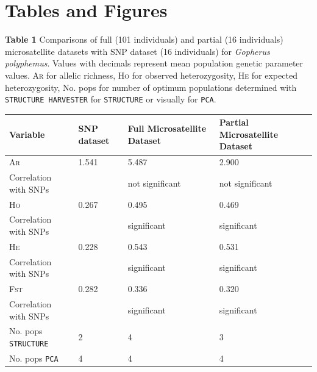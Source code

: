 \documentclass[english]{article}\usepackage[]{graphicx}\usepackage[]{color}
\begin{document}
\section*{Tables and Figures}
\noindent
\textbf{Table 1} Comparisons of full (101 individuals) and partial (16 individuals) microsatellite datasets with SNP dataset (16 individuals) for \textit{Gopherus polyphemus}. Values with decimals represent mean population genetic parameter values. \textsc{Ar} for allelic richness, \textsc{Ho} for observed heterozygosity, \textsc{He} for expected heterozygosity, No. pops for number of optimum populations determined with \texttt{STRUCTURE HARVESTER} for \texttt{STRUCTURE} or visually for \texttt{PCA}. \\
\begin{table}[ht]
\centering
\begin{tabular}{llll}
\hline
Variable & SNP dataset & Full Microsatellite Dataset & Partial Microsatellite Dataset \\ 
\hline
\textsc{Ar}           & 1.541  & 5.487           & 2.900           \\
Correlation with SNPs &        & not significant & not significant \\
\hline
\textsc{Ho}           & 0.267  & 0.495           & 0.469           \\
Correlation with SNPs &        & significant     & significant     \\
\hline
\textsc{He}           & 0.228  & 0.543    & 0.531                  \\
Correlation with SNPs &        & significant     & significant     \\
\hline
\textsc{Fst}          & 0.282  & 0.336    & 0.320                  \\
Correlation with SNPs &        & significant     & significant     \\
\hline
No. pops \texttt{STRUCTURE} & 2 & 4 & 3                            \\
\hline
No. pops \texttt{PCA} & 4 & 4 & 4                                  \\
\hline
\end{tabular}
\end{table}
\end{document}
